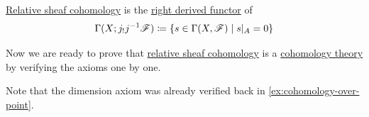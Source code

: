 \documentclass[../../main]{subfiles}
\begin{document}
\begin{remark}
  \hyperref[def:relative-sheaf-cohomology]{Relative sheaf cohomology} is the \hyperref[def:right-derived-functor]{right derived functor} of
  \begin{equation*}
    \Gamma(X; j_{!}j^{-1}\mathscr{F}) \coloneq \left\{ s \in \Gamma(X, \mathscr{F}) \mid s|_{A} = 0\right\}
  \end{equation*}
\end{remark}

Now we are ready to prove that \hyperref[def:relative-sheaf-cohomology]{relative sheaf cohomology} is a \hyperref[def:cohomology-theory]{cohomology theory} by verifying the axioms one by one.

Note that the dimension axiom was already verified back in \autoref{ex:cohomology-over-point}.
\end{document}
